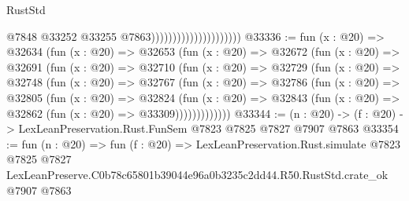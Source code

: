 \begin{lexlean}{RustStd}
\begin{coremodule}
                                              @7848
                                              @33252
                                              @33255
                                              @7863)))))))))))))))))))))
@33336 := fun (x : @20) =>
  @32634
    (fun (x : @20) =>
    @32653
      (fun (x : @20) =>
      @32672
        (fun (x : @20) =>
        @32691
          (fun (x : @20) =>
          @32710
            (fun (x : @20) =>
            @32729
              (fun (x : @20) =>
              @32748
                (fun (x : @20) =>
                @32767
                  (fun (x : @20) =>
                  @32786
                    (fun (x : @20) =>
                    @32805
                      (fun (x : @20) =>
                      @32824
                        (fun (x : @20) =>
                        @32843 (fun (x : @20) => @32862 (fun (x : @20) => @33309)))))))))))))
@33344 := (n : @20) -> (f : @20) -> LexLeanPreservation.Rust.FunSem @7823 @7825 @7827 @7907 @7863
@33354 := fun (n : @20) =>
  fun (f : @20) =>
  LexLeanPreservation.Rust.simulate
    @7823
    @7825
    @7827
    LexLeanPreserve.C0b78c65801b39044e96a0b3235c2dd44.R50.RustStd.crate_ok
    @7907
    @7863
\end{coremodule}
\end{lexlean}
